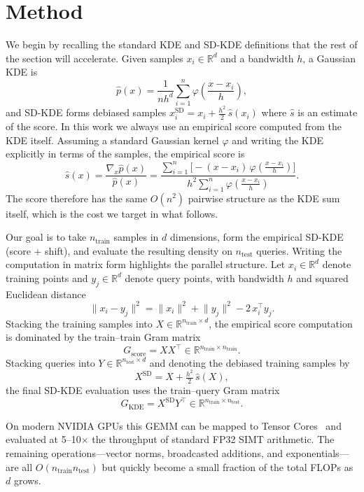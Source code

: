 \section{Method}
\label{sec:method}

We begin by recalling the standard KDE and SD-KDE definitions that the
rest of the section will accelerate.
Given samples $x_i \in \mathbb{R}^d$ and a bandwidth $h$, a Gaussian KDE is
\[
  \hat p(x)
  =
  \frac{1}{n h^d}
  \sum_{i=1}^n
  \varphi\!\left(\frac{x - x_i}{h}\right),
\]
and SD-KDE forms debiased samples
$x_i^{\mathrm{SD}} = x_i + \tfrac{h^2}{2}\,\hat s(x_i)$ where $\hat s$ is
an estimate of the score.
In this work we always use an empirical score computed from the KDE
itself.
Assuming a standard Gaussian kernel $\varphi$ and writing the KDE
explicitly in terms of the samples, the empirical score is
\[
  \hat s(x)
  =
  \frac{\nabla_x \hat p(x)}{\hat p(x)}
  =
  \frac{\sum_{i=1}^n \bigl[-({x - x_i})\,\varphi\!\left(\tfrac{x - x_i}{h}\right)\bigr]}
       {h^2 \sum_{i=1}^n \varphi\!\left(\tfrac{x - x_i}{h}\right)}.
\]
The score therefore has the same $O(n^2)$ pairwise structure as the KDE
sum itself, which is the cost we target in what follows.

Our goal is to take $n_{\text{train}}$ samples in $d$ dimensions, form the
empirical SD-KDE (score + shift), and evaluate the resulting density on
$n_{\text{test}}$ queries.  Writing the computation in matrix form highlights
the parallel structure.  Let $x_i \in \mathbb{R}^d$ denote training points and $y_j \in \mathbb{R}^d$
denote query points, with bandwidth $h$ and squared Euclidean distance
\[
  \lVert x_i - y_j \rVert^2
  =
  \lVert x_i \rVert^2
  +
  \lVert y_j \rVert^2
  - 2\,x_i^\top y_j.
\]
Stacking the training samples into $X \in \mathbb{R}^{n_{\text{train}}\times d}$,
the empirical score computation is dominated by the train--train
Gram matrix
\[
  G_{\text{score}}
  =
  X X^\top
  \in
  \mathbb{R}^{n_{\text{train}}\times n_{\text{train}}}.
\]
Stacking queries into $Y \in \mathbb{R}^{n_{\text{test}}\times d}$ and
denoting the debiased training samples by
\[
  X^{\mathrm{SD}} = X + \tfrac{h^2}{2}\,\hat s(X),
\]
the final SD-KDE evaluation uses the train--query Gram matrix
\[
  G_{\text{KDE}}
  =
  X^{\mathrm{SD}} Y^\top
  \in
  \mathbb{R}^{n_{\text{train}}\times n_{\text{test}}}.
\]

On
modern NVIDIA GPUs this GEMM can be mapped to Tensor Cores~\citep{micikevicius2017mixed} and evaluated at
5--10$\times$ the throughput of standard FP32 SIMT arithmetic.
The remaining operations---vector norms,
broadcasted additions, and exponentials---are all $O(n_{\text{train}}
 n_{\text{test}})$ but quickly become a small fraction of the total FLOPs as
$d$ grows.

